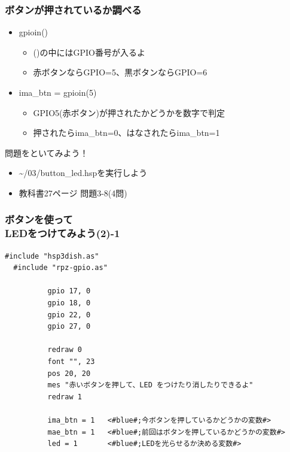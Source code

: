 \documentclass[slide03.tex]{subfiles}
\begin{document}
\begin{frame}
  \frametitle{ボタンが押されているか調べる}
  \begin{itemize}
    \item gpioin()
          \begin{itemize}
            \item ()の中にはGPIO番号が入るよ
            \item 赤ボタンならGPIO=5、黒ボタンならGPIO=6
          \end{itemize}
    \item ima\_btn = gpioin(5)
          \begin{itemize}
            \item GPIO5(赤ボタン)が押されたかどうかを数字で判定
            \item 押されたらima\_btn=0、はなされたらima\_btn=1
          \end{itemize}
  \end{itemize}
\end{frame}

\begin{frame}
  \begin{exampleblock}{問題をといてみよう！}
    \begin{itemize}
      \item \sim/03/button\_led.hspを実行しよう
      \item 教科書27ページ 問題3-8(4問)
    \end{itemize}
  \end{exampleblock}
\end{frame}

\begin{frame}[fragile]
  \frametitle{ボタンを使って\\LEDをつけてみよう(2)-1}
  \begin{lstlisting}[title=\sim/03/button\_led2.hsp 前半, label=button_led2.hsp-1]
  #include "hsp3dish.as"
  #include "rpz-gpio.as"

          gpio 17, 0
          gpio 18, 0
          gpio 22, 0
          gpio 27, 0

          redraw 0
          font "", 23
          pos 20, 20
          mes "赤いボタンを押して、LED をつけたり消したりできるよ"
          redraw 1

          ima_btn = 1   <#blue#;今ボタンを押しているかどうかの変数#>
          mae_btn = 1   <#blue#;前回はボタンを押しているかどうかの変数#>
          led = 1       <#blue#;LEDを光らせるか決める変数#>
  \end{lstlisting}
\end{frame}
\end{document}
